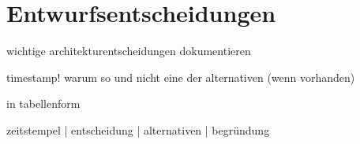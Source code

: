 \chapter{Entwurfsentscheidungen}


wichtige architekturentscheidungen dokumentieren

timestamp!
warum so und nicht eine der alternativen (wenn vorhanden)

in tabellenform

zeitstempel | entscheidung | alternativen | begründung



